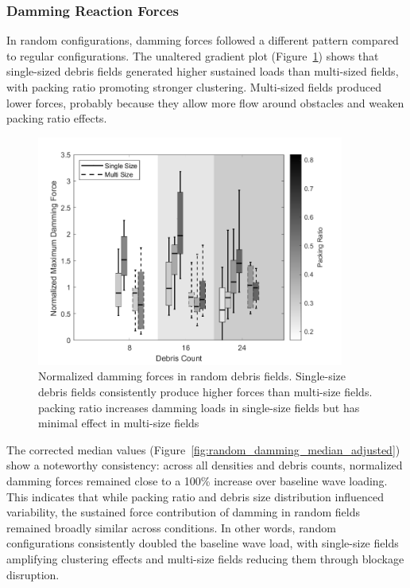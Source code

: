 \documentclass{article}
\begin{document}
{\subsubsection{Damming Reaction Forces} 
In random configurations, damming forces followed a different pattern compared to regular configurations. The unaltered gradient plot (Figure~\ref{fig:random_damming_gradient}) shows that single-sized debris fields generated higher sustained loads than multi-sized fields, with packing ratio promoting stronger clustering. Multi-sized fields produced lower forces, probably because they allow more flow around obstacles and weaken packing ratio effects.

\begin{figure}[htbp]
    \centering
    \includegraphics[width=0.9\textwidth]{Damming_Random_Single_vs_Multi_ByDensityGradient.png}
    \caption{Normalized damming forces in random debris fields. Single-size debris fields consistently produce higher forces than multi-size fields. packing ratio increases damming loads in single-size fields but has minimal effect in multi-size fields}
    \label{fig:random_damming_gradient}
\end{figure}

The corrected median values (Figure~\ref{fig:random_damming_median_adjusted}) show a noteworthy consistency: across all densities and debris counts, normalized damming forces remained close to a 100\% increase over baseline wave loading. This indicates that while packing ratio and debris size distribution influenced variability, the sustained force contribution of damming in random fields remained broadly similar across conditions. In other words, random configurations consistently doubled the baseline wave load, with single-size fields amplifying clustering effects and multi-size fields reducing them through blockage disruption.

}
\end{document}
